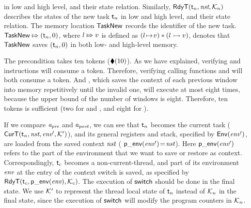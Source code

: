 in low and high level, and their state relation. 
Similarly, $\textsf{RdyT}({\textsf{t}_n}, {\textit{nst}}, {\mathcal{K}_n})$
describes the states of the new task $\textsf{t}_n$ in low and high level,
and their state relation.
The memory location
$\mathsf{TaskNew}$ records the identifier of the new task.
${\mathsf{TaskNew}}\Mapsto{(\textsf{t}_n, 0)}$, where ${l}\Mapsto{v}$ 
is defined as $({l} \!\mapsto\! {v}) * ({l} \rightarrowtail {v})$, 
denotes that
$\mathsf{TaskNew}$ saves $(\textsf{t}_n, 0)$
in both low- and high-level memory.

The precondition takes ten tokens ($\blacklozenge({10})$).
As we have explained, verifying \call{}
and \jmp{} instructions will consume a token.
Therefore, verifying calling functions
\regsave{} and \regrestore{} will
both consume a token. And \SaveUsedWin{},
which saves the context of each previous window
into memory repetitively until the invalid one,
will execute at most eight times,
because the upper bound of
the number of windows is eight.
Therefore, ten tokens is sufficient (two for \regsave{} and
\regrestore{}, and eight for \SaveUsedWin{}).

If we compare $\textit{a}_\textit{pre}$ and $\textit{a}_\textit{post}$, we can see that
$\textsf{t}_n$ becomes the current task
($\textsf{CurT}({\textsf{t}_n}, {\textit{nst}}, {\textit{env}'}, {\mathcal{K}'})$),
and its general registers and stack, specified by
$\mathsf{Env}({\textit{env}'})$, are loaded from the saved context
$\textit{nst}$ (\ie{} $\mathsf{p\_env}({\textit{env}'})\!=\!\textit{nst}$).
Here $\mathsf{p\_env}({\textit{env}'})$ refers to the part of the environment
that we want to save or restore as context.
Correspondingly, $\textsf{t}_c$ becomes a non-current-thread,
and part of its environment $\textit{env}$ at the entry of
the context switch is saved, as specified by
$\textsf{RdyT}({\textsf{t}_c}, {\mathsf{p\_env}({\textit{env}})}, {\mathcal{K}_c})$.
The execution of $\mathsf{switch}$ should be done in the final state.
We use $\mathcal{K}'$ to represent the thread local
state of $\textsf{t}_n$ instead of $\mathcal{K}_n$
in the final state, since the execution of
$\mathsf{switch}$ will modify the program counters
in $\mathcal{K}_n$.

